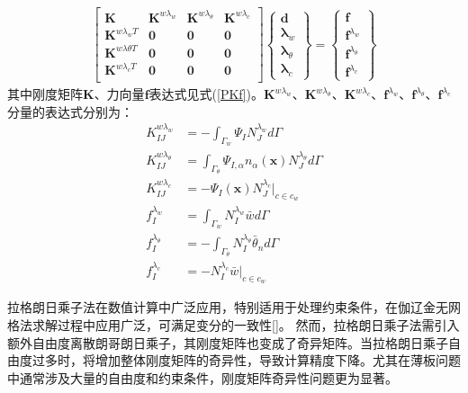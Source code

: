 \begin{equation}
    \begin{split}
     \begin{bmatrix}\pmb{K}&\pmb{K}^{w\lambda_w}&\pmb{K}^{w\lambda_\theta}&\pmb{K}^{w\lambda_c}\\
     \pmb{K}^{w\lambda_w T}&\pmb 0&\pmb 0&\pmb 0\\
     \pmb{K}^{w\lambda\theta T}&\pmb 0&\pmb 0&\pmb 0\\
     \pmb{K}^{w\lambda_c T}&\pmb 0&\pmb 0&\pmb 0\\
     \end{bmatrix}
     \left\{\begin{matrix}
     \pmb{d}\\\pmb \lambda_w\\\pmb \lambda_{\theta}\\\pmb\lambda_c
     \end{matrix}\right\}=
     \left\{\begin{matrix}
     \pmb{f}\\\pmb f^{\lambda_w}\\\pmb f^{\lambda_\theta}\\\pmb f^{\lambda_c}
     \end{matrix}\right\}
\end{split}
\end{equation}
其中刚度矩阵$\pmb{K}$、力向量$\pmb{f}$表达式见式(\ref{PKf})。$\pmb K^{w\lambda_w}$、$\pmb K^{w\lambda_\theta}$、$\pmb K^{w\lambda_c}$、$\pmb f^{\lambda_w}$、$\pmb f^{\lambda_\theta}$、$\pmb f^{\lambda_c}$分量的表达式分别为：
\begin{subequations}
\begin{align}
    K_{IJ}^{w\lambda_w}&=-\int_{\Gamma_w}\Psi_IN_J^{\lambda_w}d\Gamma\\
    K_{IJ}^{w\lambda_\theta}&=\int_{\Gamma_\theta}\Psi_{I,\alpha}n_\alpha(\pmb{x})N_J^{\lambda_\theta}d\Gamma\\
    K_{IJ}^{w\lambda_c}&=-\Psi_I(\pmb{x})N_J^{\lambda_c}\vert_{c\in c_w}\\
    f_I^{\lambda_w}&=\int_{\Gamma_w}N_I^{\lambda_w}\bar{w}d\Gamma\\
    f_I^{\lambda_\theta}&=-\int_{\Gamma_\theta}N_I^{\lambda_\theta}\bar{\theta}_nd\Gamma\\
    f_I^{\lambda_c}&=-N_I^{\lambda_c}\bar{w}\vert_{c\in c_w}
\end{align}
\end{subequations}\par
拉格朗日乘子法在数值计算中广泛应用，特别适用于处理约束条件，在伽辽金无网格法求解过程中应用广泛，可满足变分的一致性[]。
然而，拉格朗日乘子法需引入额外自由度离散朗哥朗日乘子，其刚度矩阵也变成了奇异矩阵。当拉格朗日乘子自由度过多时，将增加整体刚度矩阵的奇异性，导致计算精度下降。尤其在薄板问题中通常涉及大量的自由度和约束条件，刚度矩阵奇异性问题更为显著。
